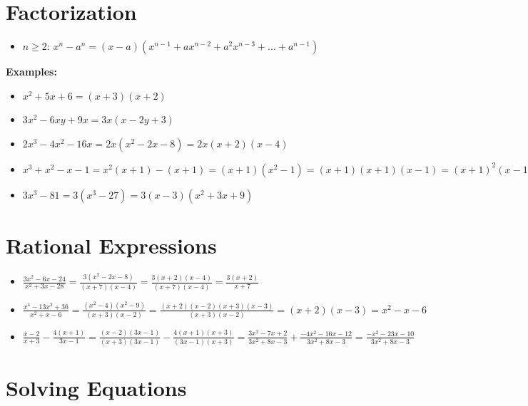 \documentclass{article}
\begin{document}
\section{Factorization}

\begin{itemize}
\item \(n \geq 2\): \(x^n - a^n = (x - a)(x^{n-1} + ax^{n-2} + a^2x^{n-3} + ... + a^{n-1})\)
\end{itemize}

\textbf{Examples:}
\begin{itemize}
\item \(x^2 + 5x + 6 = (x + 3)(x + 2)\)
\item \(3x^2 - 6xy + 9x = 3x(x - 2y + 3)\)
\item \(2x^3 - 4x^2 - 16x = 2x(x^2 - 2x - 8) = 2x(x + 2)(x - 4)\)
\item \(x^3 + x^2 - x - 1 = x^2(x + 1) - (x + 1) = (x + 1)(x^2 - 1) = (x + 1)(x + 1)(x - 1) = (x + 1)^2 (x - 1)\)
\item \(3x^3 - 81 = 3(x^3 - 27) = 3(x - 3)(x^2 + 3x + 9)\)
\end{itemize}



\section{Rational Expressions}

\begin{itemize}
\item \(\frac{3x^2 - 6x - 24}{x^2 + 3x - 28} = \frac{3(x^2 - 2x - 8)}{(x + 7)(x - 4)} = \frac{3(x + 2)(x - 4)}{(x + 7)(x - 4)} = \frac{3(x + 2)}{x + 7}\)
\item \(\frac{x^4 - 13x^2 + 36}{x^2 + x - 6} = \frac{(x^2 - 4)(x^2 - 9)}{(x + 3)(x - 2)} = \frac{(x + 2)(x - 2)(x + 3)(x - 3)}{(x + 3)(x - 2)} = (x + 2)(x - 3) = x^2 - x - 6\)
\item \(\frac{x - 2}{x + 3} - \frac{4(x + 1)}{3x - 1} = \frac{(x - 2)(3x - 1)}{(x + 3)(3x - 1)} - \frac{4(x + 1)(x + 3)}{(3x - 1)(x + 3)} = \frac{3x^2 - 7x + 2}{3x^2 + 8x - 3} + \frac{-4x^2 - 16x - 12}{3x^2 + 8x - 3} = \frac{-x^2 - 23x - 10}{3x^2 + 8x - 3}\)
\end{itemize}



\section{Solving Equations}
\end{document}
